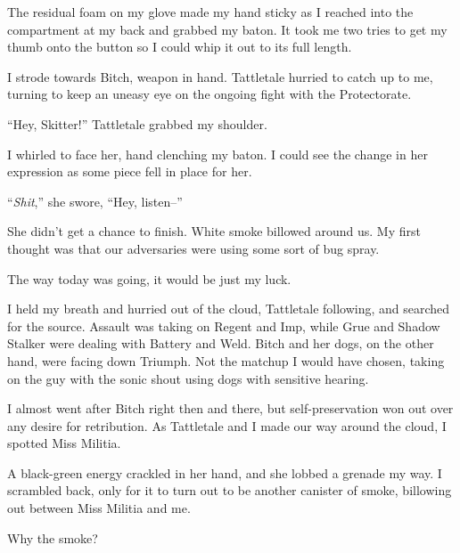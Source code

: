





The residual foam on my glove made my hand sticky as I reached into the compartment at my back and grabbed my baton.  It took me two tries to get my thumb onto the button so I could whip it out to its full length.



I strode towards Bitch, weapon in hand.  Tattletale hurried to catch up to me, turning to keep an uneasy eye on the ongoing fight with the Protectorate.



``Hey, Skitter!'' Tattletale grabbed my shoulder.



I whirled to face her, hand clenching my baton.  I could see the change in her expression as some piece fell in place for her.



``\emph{Shit},'' she swore, ``Hey, listen--''



She didn't get a chance to finish.  White smoke billowed around us.  My first thought was that our adversaries were using some sort of bug spray.



The way today was going, it would be just my luck.



I held my breath and hurried out of the cloud, Tattletale following, and searched for the source.  Assault was taking on Regent and Imp, while Grue and Shadow Stalker were dealing with Battery and Weld.  Bitch and her dogs, on the other hand, were facing down Triumph.  Not the matchup I would have chosen, taking on the guy with the sonic shout using dogs with sensitive hearing.



I almost went after Bitch right then and there, but self-preservation won out over any desire for retribution.  As Tattletale and I made our way around the cloud, I spotted Miss Militia.



A black-green energy crackled in her hand, and she lobbed a grenade my way.  I scrambled back, only for it to turn out to be another canister of smoke, billowing out between Miss Militia and me.



Why the smoke?



